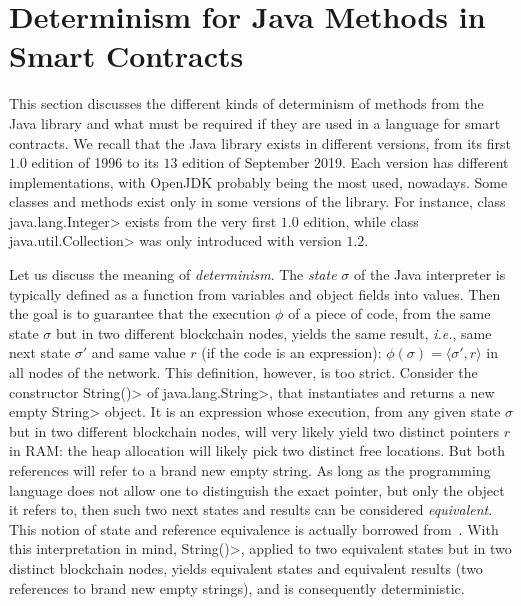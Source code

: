 \section{Determinism for Java Methods in Smart Contracts}\label{sec:determinism}

This section discusses the different kinds of determinism of methods from
the Java library and what must be required if they are used
in a language for smart contracts.
We recall that the Java library exists in different versions, from its first
$1.0$ edition of 1996 to its $13$ edition of September 2019.
Each version has different implementations, with OpenJDK probably being
the most used, nowadays. Some classes and methods exist only in some versions of the library.
For instance, class \<java.lang.Integer> exists from the very first $1.0$ edition,
while class \<java.util.Collection> was only introduced with version $1.2$.

Let us discuss the meaning of \emph{determinism}.
The \emph{state} $\sigma$ of the Java interpreter is typically defined
as a function from variables and object fields into values.
Then the goal is to guarantee that the execution $\phi$ of a piece of code,
from the same state $\sigma$ but in two different blockchain nodes, yields the same result, \emph{i.e.},
same next state $\sigma'$ and same value $r$ (if the code is an expression):
$\phi(\sigma)=\langle\sigma',r\rangle$ in all nodes of the network.
This definition, however, is too strict. Consider the constructor
\<String()> of \<java.lang.String>, that instantiates and returns a new empty \<String>
object. It is an expression whose execution,
from any given state $\sigma$ but in two different blockchain nodes,
will very likely yield two distinct
pointers $r$ in RAM: the heap allocation will likely
pick two distinct free locations.
But both references will refer to a brand new empty string.
As long as the programming language does not allow one to distinguish
the exact pointer, but only the object it refers to,
then such two next states and results can be considered \emph{equivalent}.
This notion of state and reference equivalence is actually borrowed
from~\cite{BanerjeeN05,BarthePR13}.
With this interpretation in mind, \<String()>, applied to two equivalent
states but in two distinct blockchain nodes,
yields equivalent states and equivalent results (two references to
brand new empty strings), and is consequently deterministic.

